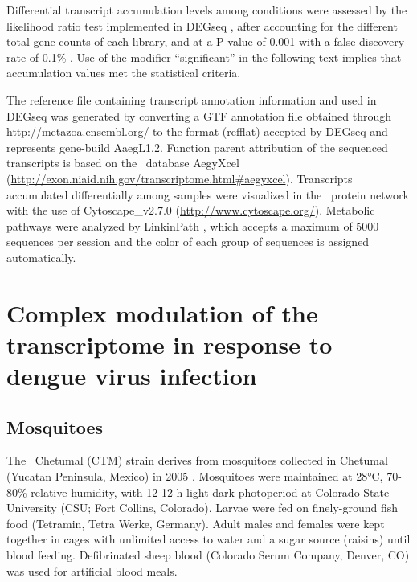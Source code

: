 Differential transcript accumulation levels among conditions were assessed by the likelihood ratio test implemented in DEGseq \cite{Wang2010}, after accounting for the different total gene counts of each library, and at a P value of 0.001 with a false discovery rate of 0.1\% \cite{Benjamini1995}. Use of the modifier “significant” in the following text implies that accumulation values met the statistical criteria.

The reference file containing transcript annotation information and used in DEGseq was generated by converting a GTF annotation file obtained through \url{http://metazoa.ensembl.org/} to the format (refflat) accepted by DEGseq and represents gene-build AaegL1.2. Function parent attribution of the sequenced transcripts is based on the \Aa\ database AegyXcel (\url{http://exon.niaid.nih.gov/transcriptome.html#aegyxcel}). Transcripts accumulated differentially among samples were visualized in the \Aa\ protein network \cite{Guo2010} with the use of Cytoscape\_v2.7.0 (\url{http://www.cytoscape.org/}). Metabolic pathways were analyzed by LinkinPath \cite{Ingsriswang2011}, which accepts a maximum of 5000 sequences per session and the color of each group of sequences is assigned automatically.


\section{Complex modulation of the \Aea transcriptome in response to dengue virus infection}

\subsection{Mosquitoes}

The \Aa\ Chetumal (CTM) strain derives from mosquitoes collected in Chetumal (Yucatan Peninsula, Mexico) in 2005 \cite{Bernhardt2012}. Mosquitoes were maintained at 28°C, 70-80\% relative humidity, with 12-12 h light-dark photoperiod at Colorado State University (CSU; Fort Collins, Colorado). Larvae were fed on finely-ground fish food (Tetramin, Tetra Werke, Germany). Adult males and females were kept together in cages with unlimited access to water and a sugar source (raisins) until blood feeding. Defibrinated sheep blood (Colorado Serum Company, Denver, CO) was used for artificial blood meals.

